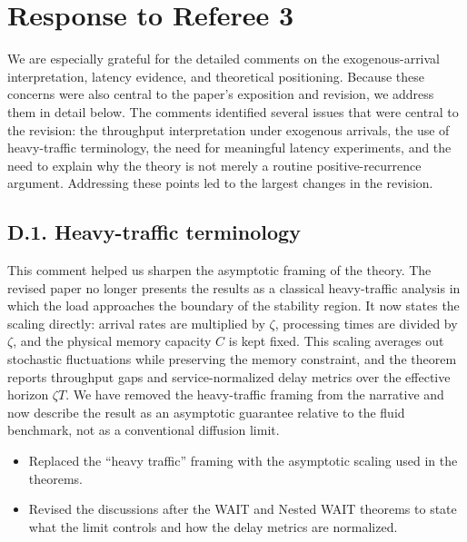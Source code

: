 \section*{Response to Referee 3}

We are especially grateful for the detailed comments on the exogenous-arrival interpretation, latency evidence, and theoretical positioning. Because these concerns were also central to the paper's exposition and revision, we address them in detail below. The comments identified several issues that were central to the revision: the throughput interpretation under exogenous arrivals, the use of heavy-traffic terminology, the need for meaningful latency experiments, and the need to explain why the theory is not merely a routine positive-recurrence argument. Addressing these points led to the largest changes in the revision.

\subsection*{D.1. Heavy-traffic terminology}


\response This comment helped us sharpen the asymptotic framing of the theory. The revised paper no longer presents the results as a classical heavy-traffic analysis in which the load approaches the boundary of the stability region. It now states the scaling directly: arrival rates are multiplied by \(\zeta\), processing times are divided by \(\zeta\), and the physical memory capacity \(C\) is kept fixed. This scaling averages out stochastic fluctuations while preserving the memory constraint, and the theorem reports throughput gaps and service-normalized delay metrics over the effective horizon \(\zeta T\). We have removed the heavy-traffic framing from the narrative and now describe the result as an asymptotic guarantee relative to the fluid benchmark, not as a conventional diffusion limit.

\changes
\begin{itemize}
    \item Replaced the ``heavy traffic'' framing with the asymptotic scaling used in the theorems.
    \item Revised the discussions after the WAIT and Nested WAIT theorems to state what the limit controls and how the delay metrics are normalized.
\end{itemize}

